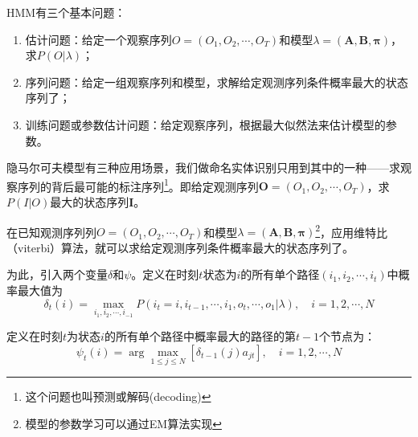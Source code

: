 \documentclass[a4paper,UTF8,no-math]{ctexart}
\begin{document}
	HMM有三个基本问题：
	
	\begin{enumerate}
		\item 估计问题：给定一个观察序列$O = (O_{1},O_{2}, \cdots ,O_{T})$和模型$\lambda=(\mathbf{A}, \mathbf{B},\mathbf{\pi})$，求$P(O | \lambda)$；
		\item 序列问题：给定一组观察序列和模型，求解给定观测序列条件概率最大的状态序列了；
		\item 训练问题或参数估计问题：给定观察序列，根据最大似然法来估计模型的参数。
	\end{enumerate}
	
	隐马尔可夫模型有三种应用场景，我们做命名实体识别只用到其中的一种——求观察序列的背后最可能的标注序列\footnote{这个问题也叫预测或解码(decoding)}。即给定观测序列$\mathbf{O} = (O_{1},O_{2}, \cdots ,O_{T})$，求$P(I|O)$最大的状态序列$\mathbf{I}$。
	
	在已知观测序列列$O = (O_{1},O_{2}, \cdots ,O_{T})$和模型$\lambda=(\mathbf{A}, \mathbf{B},\mathbf{\pi})$\footnote{模型的参数学习可以通过EM算法实现}，应用维特比（viterbi）算法，就可以求给定观测序列条件概率最大的状态序列了。
	
	为此，引入两个变量$\delta$和$\psi$。定义在时刻$t$状态为$i$的所有单个路径$\left(i_{1}, i_{2}, \cdots, i_{t}\right)$中概率最大值为$$\delta_{t}(i)=\max _{i_{1}, i_{2}, \cdots, i_{-1}} P\left(i_{t}=i, i_{t-1}, \cdots, i_{1}, o_{t}, \cdots, o_{1} | \lambda\right), \quad i=1,2, \cdots, N$$
	
	定义在时刻$t$为状态$i$的所有单个路径中概率最大的路径的第$t-1$个节点为：$$\psi_{t}(i)=\arg \max _{1 \leq j \leqslant N}\left[\delta_{t-1}(j) a_{j t}\right], \quad i=1,2, \cdots, N$$
	
\end{document}
